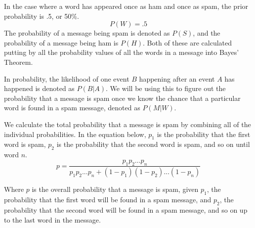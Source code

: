 \documentclass[12pt]{article}
\begin{document}
In the case where a word has appeared once as ham and once as spam, the prior probability is .5, or 50\%.
$$P(W) = .5$$
The probability of a message being spam is denoted as $P(S)$, and the probability of a message being ham is
$P(H)$. Both of these are calculated putting by all the probability values of all the words in a message into
Bayes' Theorem.

In probability, the likelihood of one event $B$ happening after an event $A$ has happened is denoted as
$P(B|A)$. We will be using this to figure out the probability that a message is spam once we know the chance
that a particular word is found in a spam message, denoted as $P(M|W)$.

We calculate the total probability that a message is spam by combining all of the individual probabilities.
In the equation below, $p_{1}$ is the probability that the first word is spam, $p_{2}$ is the probability that
the second word is spam, and so on until word $n$.
$$p=\dfrac{p_{1}p_{2} ... p_{n}}{p_{1}p_{2} ... p_{n} + (1-p_{1})(1-p_{2}) ... (1-p_{n})}$$

Where $p$ is the overall probability that a message is spam, given $p_{1}$, the probability that the first
word will be found in a spam message, and $p_{2}$, the probability that the second word will be found in a
spam message, and so on up to the last word in the message.

\end{document}
